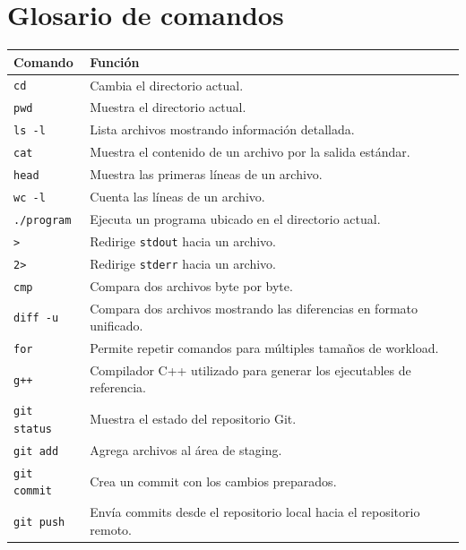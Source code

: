 \documentclass[11pt,a4paper]{article}
\begin{document}
\section{Glosario de comandos}

\begin{longtable}{p{} p{}}
\toprule
\textbf{Comando} & \textbf{Función} \\
\midrule
\endhead

\texttt{cd} &
Cambia el directorio actual. \\

\texttt{pwd} &
Muestra el directorio actual. \\

\texttt{ls -l} &
Lista archivos mostrando información detallada. \\

\texttt{cat} &
Muestra el contenido de un archivo por la salida estándar. \\

\texttt{head} &
Muestra las primeras líneas de un archivo. \\

\texttt{wc -l} &
Cuenta las líneas de un archivo. \\

\texttt{./program} &
Ejecuta un programa ubicado en el directorio actual. \\

\texttt{>} &
Redirige \texttt{stdout} hacia un archivo. \\

\texttt{2>} &
Redirige \texttt{stderr} hacia un archivo. \\

\texttt{cmp} &
Compara dos archivos byte por byte. \\

\texttt{diff -u} &
Compara dos archivos mostrando las diferencias en formato unificado. \\

\texttt{for} &
Permite repetir comandos para múltiples tamaños de workload. \\

\texttt{g++} &
Compilador C++ utilizado para generar los ejecutables de referencia. \\

\texttt{git status} &
Muestra el estado del repositorio Git. \\

\texttt{git add} &
Agrega archivos al área de staging. \\

\texttt{git commit} &
Crea un commit con los cambios preparados. \\

\texttt{git push} &
Envía commits desde el repositorio local hacia el repositorio remoto. \\

\bottomrule
\end{longtable}
\end{document}
